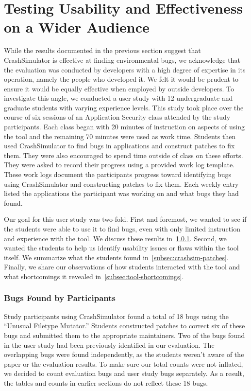 \chapter{Testing Usability and Effectiveness on a Wider Audience}
\label{chap:userstudy}

While the results documented in the previous section suggest that CrashSimulator
is effective at finding environmental bugs, we acknowledge that the evaluation
was conducted by developers with a high degree of expertise in its operation,
namely the people who developed it.  We felt it would be prudent to ensure it
would be equally effective when employed by outside developers.
To investigate this angle,
we conducted a user study
with 12 undergraduate and graduate students with varying experience levels.
This study took place over the course of six sessions
of an Application Security class attended by the study participants.
Each class began with 20
minutes of instruction on aspects of using the tool
and the remaining 70 minutes were used as work time. Students then used
CrashSimulator to find bugs in applications and construct patches to fix
them.  They were also encouraged to spend time outside
of class on these efforts.  They were asked to record their progress
using a provided work log template.  These work logs document the participants
progress toward identifying bugs using CrashSimulator and constructing patches
to fix them.  Each weekly entry listed the applications the participant was
working on and what bugs they had found.

Our goal for this user study was two-fold.  First and foremost,
we wanted to see if the students were able to use it to find bugs,
even with only limited instruction and experience with the tool.
We discuss these results in~\ref{subsec:bugs-by-participants}.
Second, we wanted the students to help us identify usability issues
or flaws within the tool itself.  We summarize what the students found
in~\ref{subsec:crashsim-patches}.  Finally, we share our observations
of how students interacted with the tool and what shortcomings
it revealed in~\ref{subsec:tool-shortcomings}.

\subsection{Bugs Found by Participants}
\label{subsec:bugs-by-participants}
Study participants using CrashSimulator found a total of 18 bugs
using the ``Unusual Filetype Mutator.''
Students constructed patches to correct six of these bugs and submitted
them to the appropriate maintainers.
Two of the bugs found in the user study
had been previously identified
in our evaluation.
The overlapping bugs were found independently,
as the students weren’t aware of the paper or the evaluation results.
To make sure our total counts were not inflated,
we decided to count evaluation bugs and user study bugs separately.
As a result, the tables and counts in earlier
sections do not reflect these 18 bugs.

